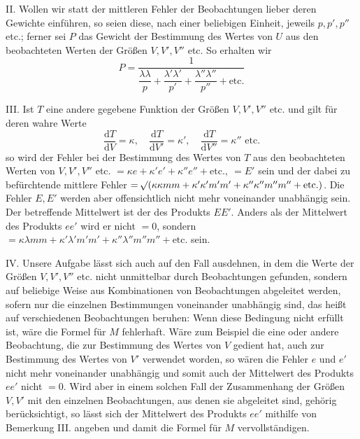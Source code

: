 II. Wollen wir statt der mittleren Fehler der Beobachtungen lieber deren Gewichte einführen, so seien diese, nach einer beliebigen Einheit, jeweils \(p,p',p''\) etc.; ferner sei \(P\) das Gewicht der Bestimmung des Wertes von \(U\) aus den beobachteten Werten der Größen \(V,V',V''\) etc. So erhalten wir
\[
P=\frac{1}{\dfrac{\lambda\lambda}{p}+\dfrac{\lambda'\lambda'}{p'}+\dfrac{\lambda''\lambda''}{p''}+\text{etc.}}
\]

III. Ist \(T\) eine andere gegebene Funktion der Größen \(V,V',V''\) etc. und gilt für deren wahre Werte
\[
\frac{\mathrm{d}T}{\mathrm{d}V}=\kappa,\quad\frac{\mathrm{d}T}{\mathrm{d}V'}=\kappa',\quad\frac{\mathrm{d}T}{\mathrm{d}V''}=\kappa''\text{ etc.}
\]
so wird der Fehler bei der Bestimmung des Wertes von \(T\) aus den beobachteten Werten von \(V,V',V''\) etc. \(=\kappa e+\kappa'e'+\kappa''e''+\text{etc.},\ =E'\) sein und der dabei zu befürchtende mittlere Fehler \(=\mathord{{}^{}\!\surd}(\kappa\kappa mm+\kappa'\kappa'm'm'+\kappa''\kappa''m''m''+\text{etc.})\). Die Fehler \(E,E'\) werden aber offensichtlich nicht mehr voneinander unabhängig sein. Der betreffende Mittelwert ist der des Produkts \(EE'\). Anders als der Mittelwert des Produkts \(ee'\) wird er nicht \(=0\), sondern \(=\kappa\lambda mm+\kappa'\lambda'm'm'+\kappa''\lambda''m''m''+\text{etc.}\) sein.

IV. Unsere Aufgabe lässt sich auch auf den Fall ausdehnen, in dem die Werte der Größen \(V,V',V''\) etc. nicht unmittelbar durch Beobachtungen gefunden, sondern auf beliebige Weise aus Kombinationen von Beobachtungen abgeleitet werden, sofern nur die einzelnen Bestimmungen voneinander unabhängig sind, das heißt auf verschiedenen Beobachtungen beruhen: Wenn diese Bedingung nicht erfüllt ist, wäre die Formel für \(M\) fehlerhaft. Wäre zum Beispiel die eine oder andere Beobachtung, die zur Bestimmung des Wertes von \(V\) gedient hat, auch zur Bestimmung des Wertes von \(V'\) verwendet worden, so wären die Fehler \(e\) und \(e'\) nicht mehr voneinander unabhängig und somit auch der Mittelwert des Produkts \(ee'\) nicht \(=0\). Wird aber in einem solchen Fall der Zusammenhang der Größen \(V,V'\) mit den einzelnen Beobachtungen, aus denen sie abgeleitet sind, gehörig berücksichtigt, so lässt sich der Mittelwert des Produkts \(ee'\) mithilfe von Bemerkung III. angeben und damit die Formel für \(M\) vervollständigen.

